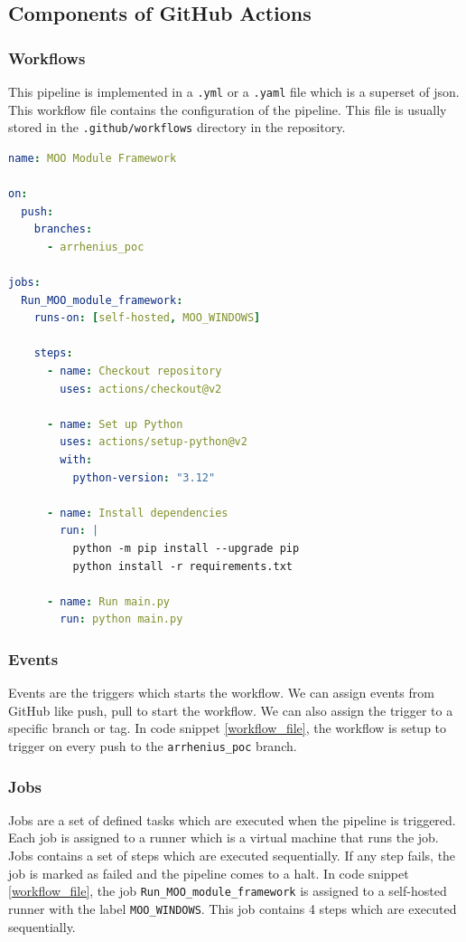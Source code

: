 \subsection{Components of GitHub Actions}
\subsubsection{Workflows}
This pipeline is implemented in a \texttt{.yml} or a \texttt{.yaml} file which is a superset of \acrshort{json}. This workflow file contains the configuration of 
the pipeline. This file is usually stored in the \texttt{.github/workflows} directory in the repository. 

\renewcommand{\lstlistingname}{Code}
\begin{lstlisting}[language=yaml, caption=Example of a GitHub Actions workflow file, label=workflow_file]
name: MOO Module Framework

on:
  push:
    branches:
      - arrhenius_poc

jobs:
  Run_MOO_module_framework:
    runs-on: [self-hosted, MOO_WINDOWS]

    steps:
      - name: Checkout repository
        uses: actions/checkout@v2

      - name: Set up Python
        uses: actions/setup-python@v2
        with:
          python-version: "3.12"

      - name: Install dependencies
        run: |
          python -m pip install --upgrade pip
          python install -r requirements.txt

      - name: Run main.py
        run: python main.py
\end{lstlisting}  

\subsubsection{Events}
Events are the triggers which starts the workflow. We can assign events from GitHub like push, pull to start the workflow. We can also assign the trigger to a 
specific branch or tag. In code snippet \ref{workflow_file}, the workflow is setup to trigger on every push to the \texttt{arrhenius\_poc} branch. 

\subsubsection{Jobs}
Jobs are a set of defined tasks which are executed when the pipeline is triggered. Each job is assigned to a runner which is a virtual machine that runs the 
job. Jobs contains a set of steps which are executed sequentially. If any step fails, the job is marked as failed and the pipeline comes to a halt. In code snippet 
\ref{workflow_file}, the job \texttt{Run\_MOO\_module\_framework} is assigned to a self-hosted runner with the label \texttt{MOO\_WINDOWS}. This 
job contains 4 steps which are executed sequentially.

